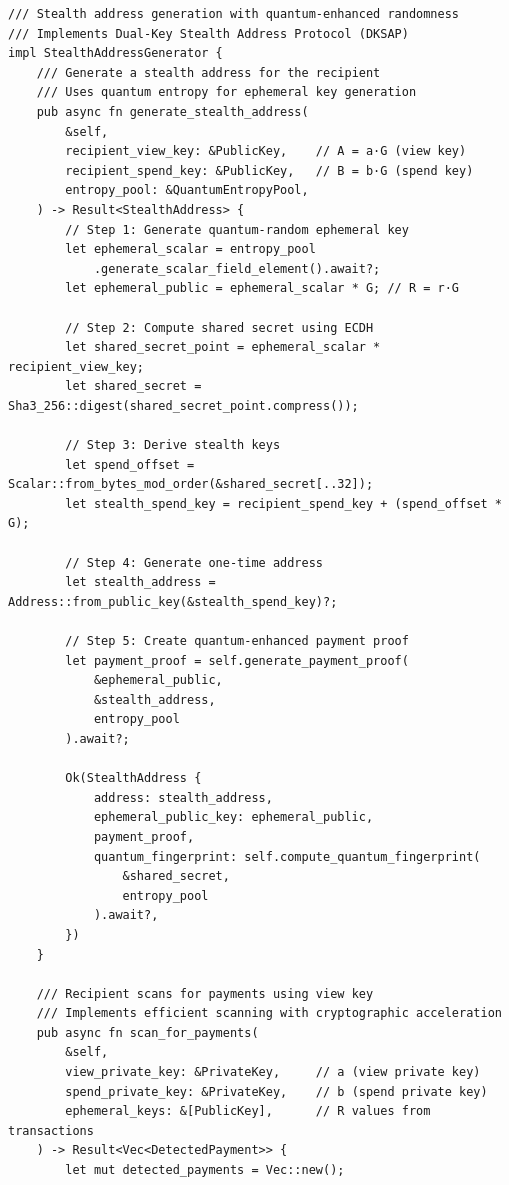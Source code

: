 \documentclass[11pt,a4paper]{article}
\begin{document}
\begin{lstlisting}[caption=Quantum-Enhanced Stealth Address Generation]
/// Stealth address generation with quantum-enhanced randomness
/// Implements Dual-Key Stealth Address Protocol (DKSAP)
impl StealthAddressGenerator {
    /// Generate a stealth address for the recipient
    /// Uses quantum entropy for ephemeral key generation
    pub async fn generate_stealth_address(
        &self,
        recipient_view_key: &PublicKey,    // A = a·G (view key)
        recipient_spend_key: &PublicKey,   // B = b·G (spend key) 
        entropy_pool: &QuantumEntropyPool,
    ) -> Result<StealthAddress> {
        // Step 1: Generate quantum-random ephemeral key
        let ephemeral_scalar = entropy_pool
            .generate_scalar_field_element().await?;
        let ephemeral_public = ephemeral_scalar * G; // R = r·G
        
        // Step 2: Compute shared secret using ECDH
        let shared_secret_point = ephemeral_scalar * recipient_view_key;
        let shared_secret = Sha3_256::digest(shared_secret_point.compress());
        
        // Step 3: Derive stealth keys
        let spend_offset = Scalar::from_bytes_mod_order(&shared_secret[..32]);
        let stealth_spend_key = recipient_spend_key + (spend_offset * G);
        
        // Step 4: Generate one-time address
        let stealth_address = Address::from_public_key(&stealth_spend_key)?;
        
        // Step 5: Create quantum-enhanced payment proof
        let payment_proof = self.generate_payment_proof(
            &ephemeral_public,
            &stealth_address,
            entropy_pool
        ).await?;
        
        Ok(StealthAddress {
            address: stealth_address,
            ephemeral_public_key: ephemeral_public,
            payment_proof,
            quantum_fingerprint: self.compute_quantum_fingerprint(
                &shared_secret, 
                entropy_pool
            ).await?,
        })
    }
    
    /// Recipient scans for payments using view key
    /// Implements efficient scanning with cryptographic acceleration
    pub async fn scan_for_payments(
        &self,
        view_private_key: &PrivateKey,     // a (view private key)
        spend_private_key: &PrivateKey,    // b (spend private key)
        ephemeral_keys: &[PublicKey],      // R values from transactions
    ) -> Result<Vec<DetectedPayment>> {
        let mut detected_payments = Vec::new();
        

\end{lstlisting}
\end{document}
